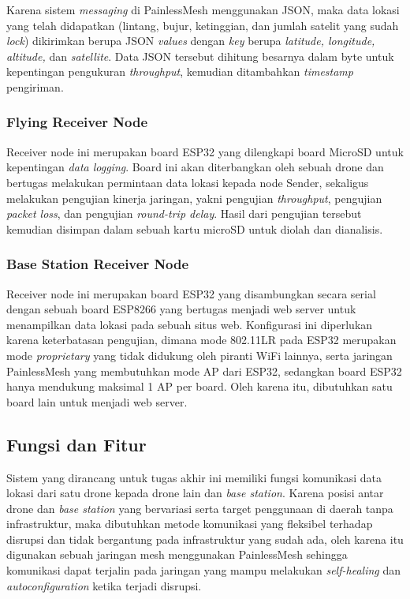 Karena sistem \textit{messaging} di PainlessMesh menggunakan JSON, maka data lokasi yang telah didapatkan (lintang, bujur, ketinggian, dan jumlah satelit yang sudah \textit{lock}) dikirimkan berupa JSON \textit{values} dengan \textit{key} berupa \textit{latitude, longitude, altitude,} dan \textit{satellite}. Data JSON tersebut dihitung besarnya dalam byte untuk kepentingan pengukuran \textit{throughput}, kemudian ditambahkan \textit{timestamp} pengiriman.

\subsubsection{Flying Receiver Node}
Receiver node ini merupakan board ESP32 yang dilengkapi board MicroSD untuk kepentingan \textit{data logging}. Board ini akan diterbangkan oleh sebuah drone dan bertugas melakukan permintaan data lokasi kepada node Sender, sekaligus melakukan pengujian kinerja jaringan, yakni pengujian \textit{throughput}, pengujian \textit{packet loss}, dan pengujian \textit{round-trip delay}. Hasil dari pengujian tersebut kemudian disimpan dalam sebuah kartu microSD untuk diolah dan dianalisis.

\subsubsection{Base Station Receiver Node}
Receiver node ini merupakan board ESP32 yang disambungkan secara serial dengan sebuah board ESP8266 yang bertugas menjadi web server untuk menampilkan data lokasi pada sebuah situs web. Konfigurasi ini diperlukan karena keterbatasan pengujian, dimana mode 802.11LR pada ESP32 merupakan mode \textit{proprietary} yang tidak didukung oleh piranti WiFi lainnya, serta jaringan PainlessMesh yang membutuhkan mode AP dari ESP32, sedangkan board ESP32 hanya mendukung maksimal 1 AP per board. Oleh karena itu, dibutuhkan satu board lain untuk menjadi web server.

\subsection{Fungsi dan Fitur}
Sistem yang dirancang untuk tugas akhir ini memiliki fungsi komunikasi data lokasi dari satu drone kepada drone lain dan \textit{base station}. Karena posisi antar drone dan \textit{base station} yang bervariasi serta target penggunaan di daerah tanpa infrastruktur, maka dibutuhkan metode komunikasi yang fleksibel terhadap disrupsi dan tidak bergantung pada infrastruktur yang sudah ada, oleh karena itu digunakan sebuah jaringan mesh menggunakan PainlessMesh sehingga komunikasi dapat terjalin pada jaringan yang mampu melakukan \textit{self-healing} dan \textit{autoconfiguration} ketika terjadi disrupsi.

